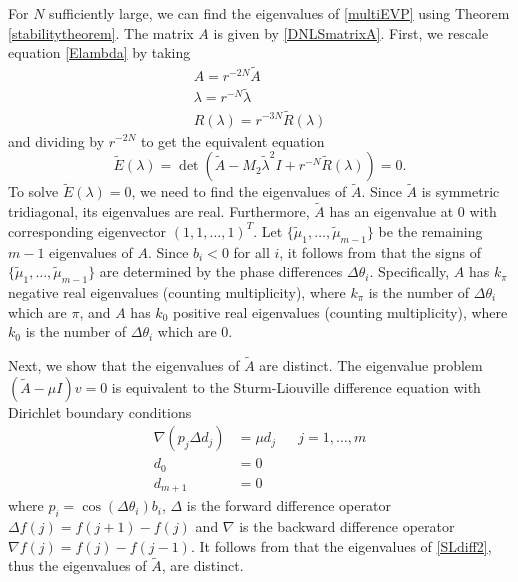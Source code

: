 \documentclass[12pt]{elsarticle}
\begin{document}
For $N$ sufficiently large, we can find the eigenvalues of \eqref{multiEVP} using Theorem \ref{stabilitytheorem}. The matrix $A$ is given by \eqref{DNLSmatrixA}. First, we rescale equation \eqref{Elambda} by taking
\begin{align*}
A = r^{-2N} \tilde{A} \\
\lambda = r^{-N} \tilde{\lambda} \\
R(\lambda) = r^{-3N} \tilde{R}(\lambda)
\end{align*}
and dividing by $r^{-2N}$ to get the equivalent equation
\begin{equation}\label{DNLStildeE}
\tilde{E}(\lambda) = 
\det(\tilde{A} - M_2 \tilde{\lambda}^2 I + r^{-N} \tilde{R}(\lambda)) = 0.
\end{equation}
To solve $\tilde{E}(\lambda) = 0$, we need to find the eigenvalues of $\tilde{A}$. Since $\tilde{A}$ is symmetric tridiagonal, its eigenvalues are real. Furthermore, $\tilde{A}$ has an eigenvalue at 0 with corresponding eigenvector $(1, 1, \dots, 1)^T$. Let $\{ \tilde{\mu}_1, \dots, \tilde{\mu}_{m-1}\}$ be the remaining $m-1$ eigenvalues of $A$. Since $b_i < 0$ for all $i$, it follows from \cite[Lemma 5.4]{Sandstede1998} that the signs of $\{ \tilde{\mu}_1, \dots, \tilde{\mu}_{m-1}\}$ are determined by the phase differences $\Delta\theta_i$. Specifically, $A$ has $k_\pi$ negative real eigenvalues (counting multiplicity), where $k_\pi$ is the number of $\Delta\theta_i$ which are $\pi$, and $A$ has $k_0$ positive real eigenvalues (counting multiplicity), where $k_0$ is the number of $\Delta\theta_i$ which are $0$. 

Next, we show that the eigenvalues of $\tilde{A}$ are distinct. The eigenvalue problem $(\tilde{A} - \mu I)v = 0$ is equivalent to the Sturm-Liouville difference equation with Dirichlet boundary conditions
\begin{equation}\label{SLdiff2}
\begin{aligned}
\nabla( p_j \Delta d_j ) &= \mu d_j && j = 1, \dots, m \\
d_0 &= 0 \\
d_{m+1} &= 0
\end{aligned}
\end{equation}
where $p_i = \cos(\Delta\theta_i) b_i$, $\Delta$ is the forward difference operator $\Delta f(j) = f(j+1) - f(j)$ and $\nabla$ is the backward difference operator $\nabla f(j) = f(j) - f(j-1)$. It follows from \cite[Corollary 2.2.7]{Jirari1995} that the eigenvalues of \eqref{SLdiff2}, thus the eigenvalues of $\tilde{A}$, are distinct.
\end{document}
